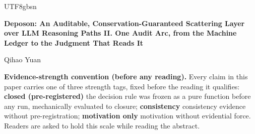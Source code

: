 \documentclass[11pt,letterpaper]{article}
\begin{document}
\begin{CJK}{UTF8}{gbsn}
\begin{center}
{\LARGE\bfseries Deposon: An Auditable, Conservation-Guaranteed Scattering Layer over LLM Reasoning Paths \textemdash{} II. One Audit Arc, from the Machine Ledger to the Judgment That Reads It\par}
\end{center}
\vspace{0.8em}
\begin{center}
{\normalsize Qihao Yuan\par}
\end{center}
\vspace{0.8em}
\textbf{Evidence-strength convention (before any reading).} Every claim in this paper carries one of three strength tags, fixed before the reading it qualifies: \textbf{closed (pre-registered)} \textemdash{} the decision rule was frozen as a pure function before any run, mechanically evaluated to closure; \textbf{consistency} \textemdash{} consistency evidence without pre-registration; \textbf{motivation only} \textemdash{} motivation without evidential force. Readers are asked to hold this scale while reading the abstract.


\end{CJK}
\end{document}

